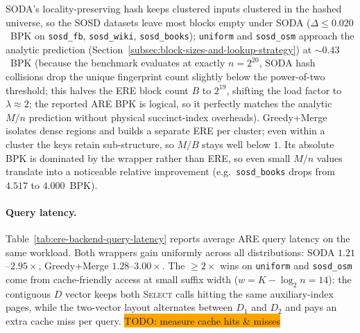 SODA's locality-preserving hash keeps clustered inputs clustered in the
hashed universe, so the SOSD datasets leave most blocks empty under
SODA ($\Delta \le 0.020$~BPK on \texttt{sosd\_fb}, \texttt{sosd\_wiki},
\texttt{sosd\_books}); \texttt{uniform} and \texttt{sosd\_osm} approach the analytic prediction
(Section~\ref{subsec:block-sizes-and-lookup-strategy}) at ${\sim}0.43$~BPK
(because the benchmark evaluates at exactly $n = 2^{20}$,
SODA hash collisions drop the unique fingerprint count slightly below the power-of-two threshold;
this halves the ERE block count $B$ to $2^{19}$, shifting the load factor to $\lambda \approx 2$;
the reported ARE BPK is logical, so it perfectly matches the analytic $M/n$ prediction without physical succinct-index overheads).
Greedy+Merge isolates dense regions and
builds a separate ERE per cluster; even within a cluster the keys
retain sub-structure, so $M/B$ stays well below $1$. Its absolute BPK
is dominated by the wrapper rather than ERE, so even small $M/n$
values translate into a noticeable relative improvement (e.g.\
\texttt{sosd\_books} drops from $4.517$ to $4.000$~BPK).

\paragraph{Query latency.}
Table~\ref{tab:ere-backend-query-latency} reports average ARE query
latency on the same workload. Both wrappers gain uniformly across all
distributions: SODA $1.21$--$2.95\times$, Greedy+Merge $1.28$--$3.00\times$.
The $\geq 2\times$ wins on \texttt{uniform} and \texttt{sosd\_osm} come
from cache-friendly access at small suffix width ($w = K - \log_2 n = 14$):
the contiguous $D$ vector keeps both \textsc{Select} calls hitting the
same auxiliary-index pages, while the two-vector layout alternates
between $D_1$ and $D_2$ and pays an extra cache miss per query.
\colorbox{orange}{TODO: measure cache hits \& misses}

